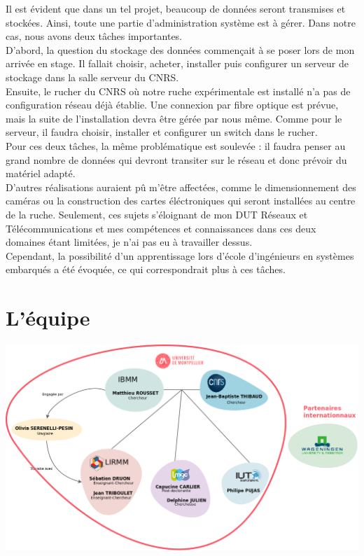 \documentclass[11pt,french,a4paper]{report}
\begin{document}
Il est évident que dans un tel projet, beaucoup de données seront transmises et stockées. Ainsi, toute une partie d'administration 
système est à gérer. Dans notre cas, nous avons deux tâches importantes.\\
D'abord, la question du stockage des données commençait à se poser lors de mon arrivée en stage. Il fallait choisir, acheter, installer
puis configurer un serveur de stockage dans la salle serveur du CNRS.\\
Ensuite, le rucher du CNRS où notre ruche expérimentale est installé n'a pas de configuration réseau déjà établie. 
Une connexion par fibre optique est prévue, mais la suite de l'installation devra être gérée par nous même. Comme pour le serveur, 
il faudra choisir, installer et configurer un switch dans le rucher.\\
Pour ces deux tâches, la même problématique est soulevée : il faudra penser au grand nombre de données qui devront transiter sur le 
réseau et donc prévoir du matériel adapté.\\
D'autres réalisations auraient pû m'être affectées, comme le dimensionnement des caméras ou la construction des cartes éléctroniques
qui seront installées au centre de la ruche. Seulement, ces sujets s'éloignant de mon DUT Réseaux et Télécommunications et mes 
compétences et connaissances dans ces deux domaines étant limitées, je n'ai pas eu à travailler dessus.\\
Cependant, la possibilité d'un apprentissage lors d'école d'ingénieurs en systèmes embarqués a été évoquée, ce qui correspondrait 
plus à ces tâches.\\


\section{L'équipe}

\includegraphics[scale=0.3]{../images/dia/organiramme_equipe_projet.png}
\end{document}
